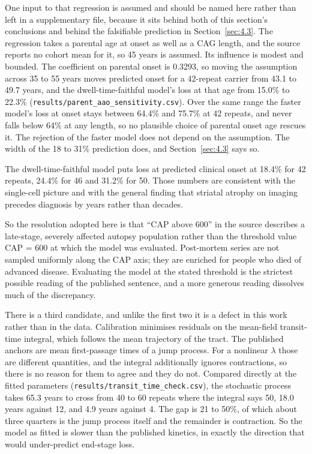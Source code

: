 \documentclass[conference]{IEEEtran}
\begin{document}
One input to that regression is assumed and should be named here rather than left in a supplementary file, because it sits behind both of this section's conclusions and behind the falsifiable prediction in Section~\ref{sec:4.3}. The regression takes a parental age at onset as well as a CAG length, and the source reports no cohort mean for it, so 45 years is assumed. Its influence is modest and bounded. The coefficient on parental onset is 0.3293, so moving the assumption across 35 to 55 years moves predicted onset for a 42-repeat carrier from 43.1 to 49.7 years, and the dwell-time-faithful model's loss at that age from 15.0\% to 22.3\% (\texttt{results/\allowbreak{}parent\_\allowbreak{}aao\_\allowbreak{}sensitivity.\allowbreak{}csv}). Over the same range the faster model's loss at onset stays between 64.4\% and 75.7\% at 42 repeats, and never falls below 64\% at any length, so no plausible choice of parental onset age rescues it. The rejection of the faster model does not depend on the assumption. The width of the 18 to 31\% prediction does, and Section~\ref{sec:4.3} says so.

The dwell-time-faithful model puts loss at predicted clinical onset at 18.4\% for 42 repeats, 24.4\% for 46 and 31.2\% for 50. Those numbers are consistent with the single-cell picture and with the general finding that striatal atrophy on imaging precedes diagnosis by years rather than decades.

So the resolution adopted here is that ``CAP above 600'' in the source describes a late-stage, severely affected autopsy population rather than the threshold value CAP = 600 at which the model was evaluated. Post-mortem series are not sampled uniformly along the CAP axis; they are enriched for people who died of advanced disease. Evaluating the model at the stated threshold is the strictest possible reading of the published sentence, and a more generous reading dissolves much of the discrepancy.

There is a third candidate, and unlike the first two it is a defect in this work rather than in the data. Calibration minimises residuals on the mean-field transit-time integral, which follows the mean trajectory of the tract. The published anchors are mean first-passage times of a jump process. For a nonlinear $\lambda$ those are different quantities, and the integral additionally ignores contractions, so there is no reason for them to agree and they do not. Compared directly at the fitted parameters (\texttt{results/\allowbreak{}transit\_\allowbreak{}time\_\allowbreak{}check.\allowbreak{}csv}), the stochastic process takes 65.3 years to cross from 40 to 60 repeats where the integral says 50, 18.0 years against 12, and 4.9 years against 4. The gap is 21 to 50\%, of which about three quarters is the jump process itself and the remainder is contraction. So the model as fitted is slower than the published kinetics, in exactly the direction that would under-predict end-stage loss.
\end{document}
